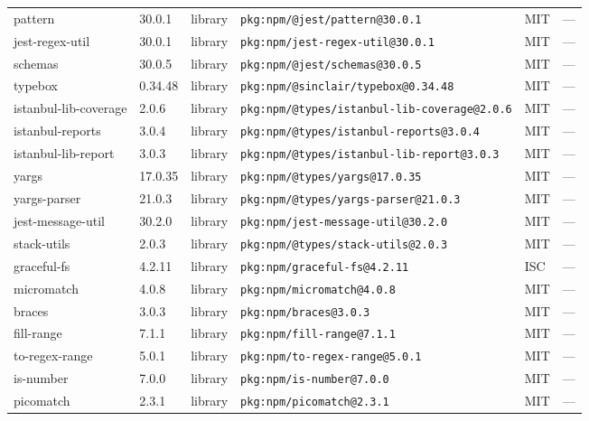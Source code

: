 \documentclass[11pt,a4paper]{article}
\begin{document}
\begin{longtable}{|p{4cm}|p{2cm}|p{1.6cm}|p{5cm}|p{1.5cm}|p{3.5cm}|}
\raggedright pattern & 30.0.1 & library & \small\texttt{pkg:npm/@jest/pattern@30.0.1} & MIT & \small — \\
\raggedright jest-regex-util & 30.0.1 & library & \small\texttt{pkg:npm/jest-regex-util@30.0.1} & MIT & \small — \\
\raggedright schemas & 30.0.5 & library & \small\texttt{pkg:npm/@jest/schemas@30.0.5} & MIT & \small — \\
\raggedright typebox & 0.34.48 & library & \small\texttt{pkg:npm/@sinclair/typebox@0.34.48} & MIT & \small — \\
\raggedright istanbul-lib-coverage & 2.0.6 & library & \small\texttt{pkg:npm/@types/istanbul-lib-coverage@2.0.6} & MIT & \small — \\
\raggedright istanbul-reports & 3.0.4 & library & \small\texttt{pkg:npm/@types/istanbul-reports@3.0.4} & MIT & \small — \\
\raggedright istanbul-lib-report & 3.0.3 & library & \small\texttt{pkg:npm/@types/istanbul-lib-report@3.0.3} & MIT & \small — \\
\raggedright yargs & 17.0.35 & library & \small\texttt{pkg:npm/@types/yargs@17.0.35} & MIT & \small — \\
\raggedright yargs-parser & 21.0.3 & library & \small\texttt{pkg:npm/@types/yargs-parser@21.0.3} & MIT & \small — \\
\raggedright jest-message-util & 30.2.0 & library & \small\texttt{pkg:npm/jest-message-util@30.2.0} & MIT & \small — \\
\raggedright stack-utils & 2.0.3 & library & \small\texttt{pkg:npm/@types/stack-utils@2.0.3} & MIT & \small — \\
\raggedright graceful-fs & 4.2.11 & library & \small\texttt{pkg:npm/graceful-fs@4.2.11} & ISC & \small — \\
\raggedright micromatch & 4.0.8 & library & \small\texttt{pkg:npm/micromatch@4.0.8} & MIT & \small — \\
\raggedright braces & 3.0.3 & library & \small\texttt{pkg:npm/braces@3.0.3} & MIT & \small — \\
\raggedright fill-range & 7.1.1 & library & \small\texttt{pkg:npm/fill-range@7.1.1} & MIT & \small — \\
\raggedright to-regex-range & 5.0.1 & library & \small\texttt{pkg:npm/to-regex-range@5.0.1} & MIT & \small — \\
\raggedright is-number & 7.0.0 & library & \small\texttt{pkg:npm/is-number@7.0.0} & MIT & \small — \\
\raggedright picomatch & 2.3.1 & library & \small\texttt{pkg:npm/picomatch@2.3.1} & MIT & \small — \\

\end{longtable}
\end{document}
